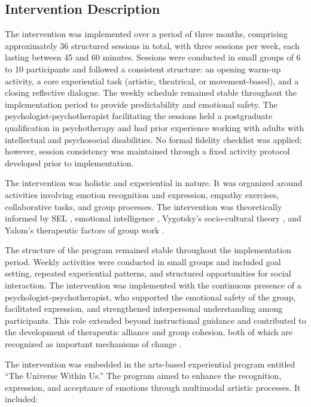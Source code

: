 \documentclass[12pt,a4paper]{article}
\begin{document}
\subsection{Intervention Description}

The intervention was implemented over a period of three months,
comprising approximately 36 structured sessions in total, with
three sessions per week, each lasting between 45 and 60 minutes.
Sessions were conducted in small groups of 6 to 10 participants
and followed a consistent structure: an opening warm-up activity,
a core experiential task (artistic, theatrical, or movement-based),
and a closing reflective dialogue. The weekly schedule remained
stable throughout the implementation period to provide predictability
and emotional safety. The psychologist-psychotherapist facilitating
the sessions held a postgraduate qualification in psychotherapy and
had prior experience working with adults with intellectual and
psychosocial disabilities. No formal fidelity checklist was applied;
however, session consistency was maintained through a fixed
activity protocol developed prior to implementation.

The intervention was holistic and experiential in nature. It was organized around activities involving emotion recognition and expression, empathy exercises, collaborative tasks, and group processes. The intervention was theoretically informed by SEL \parencite{casel2020}, emotional intelligence \parencite{goleman1995}, Vygotsky's socio-cultural theory \parencite{vygotsky1978}, and Yalom's therapeutic factors of group work \parencite{yalom2005}.

The structure of the program remained stable throughout the implementation period. Weekly activities were conducted in small groups and included goal setting, repeated experiential patterns, and structured opportunities for social interaction. The intervention was implemented with the continuous presence of a psychologist-psychotherapist, who supported the emotional safety of the group, facilitated expression, and strengthened interpersonal understanding among participants. This role extended beyond instructional guidance and contributed to the development of therapeutic alliance and group cohesion, both of which are recognized as important mechanisms of change \parencite{norcross2018,burlingame2011}.

The intervention was embedded in the arts-based experiential program entitled ``The Universe Within Us.'' The program aimed to enhance the recognition, expression, and acceptance of emotions through multimodal artistic processes. It included:
\end{document}
